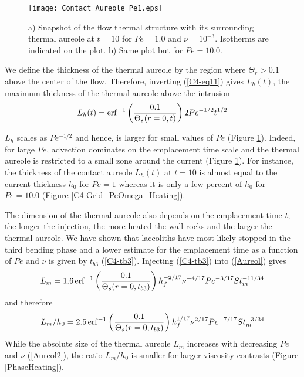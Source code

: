 \begin{figure}[h!]
  \begin{center}
    \graphicspath{ {/Users/thorey/Documents/These/Projet/Refroidissement/Skin_Model/Figure/Figure_Heating/} }
    \texttt{[image: Contact\_Aureole\_Pe1.eps]}
    \caption{a)  Snapshot  of  the  flow thermal  structure  with  its
      surrounding  thermal   aureole  at   $t=10$  for   $Pe=1.0$  and
      $\nu=10^{-3}$.  Isotherms  are indicated  on the plot.   b) Same
      plot but for $Pe=10.0$.}
    \label{Contact_Areuol2}
  \end{center}
\end{figure}

We define  the thickness of  the thermal  aureole by the  region where
$\Theta_r>0.1$  above the  center of  the flow.   Therefore, inverting
(\ref{C4-eq11}) gives  $L_h(t)$, the maximum thickness  of the thermal
aureole above the intrusion
\begin{equation}
  L_h(t)                                                           =
  \operatorname{erf}^{-1}\left(\frac{0.1}{\Theta_s(r=0,t)}\right)2Pe^{-1/2}t^{1/2}
  \label{Aureol}
\end{equation}

$L_h$ scales as  $Pe^{-1/2}$ and hence, is larger for  small values of
$Pe$ (Figure \ref{Contact_Areuol2}). Indeed, for large $Pe$, advection
dominates on  the emplacement  time scale and  the thermal  aureole is
restricted   to   a   small    zone   around   the   current   (Figure
\ref{Contact_Areuol2}).  For  instance, the  thickness of  the contact
aureole $L_h(t)$  at $t=10$ is  almost equal to the  current thickness
$h_0$  for $Pe=1$  whereas  it is  only  a few  percent  of $h_0$  for
$Pe=10.0$ (Figure \ref{C4-Grid_PeOmega_Heating}).

The dimension of  the thermal aureole also depends  on the emplacement
time $t$; the longer the injection, the more heated the wall rocks and
the larger  the thermal  aureole. We have  shown that  laccoliths have
most likely  stopped in the third  bending phase and a  lower estimate
for the emplacement time  as a function of $Pe$ and  $\nu$ is given by
$t_{b3}$ (\ref{C4-tb3}).  Injecting (\ref{C4-tb3}) into (\ref{Aureol})
gives
\begin{equation}
  L_m                                                           =1.6
  \operatorname{erf}^{-1}\left(\frac{0.1}{\Theta_s(r=0,t_{b3})}\right)h_f^{-2/17}\nu^{-4/17}Pe^{-3/17}St_m^{-11/34}
  \label{Aureol2}
\end{equation}
and therefore
\begin{equation}
  L_m/h_0                                                           =2.5
  \operatorname{erf}^{-1}\left(\frac{0.1}{\Theta_s(r=0,t_{b3})}\right)h_f^{1/17}\nu^{2/17}Pe^{-7/17}St_m^{-3/34}
  \label{Aureol3}
\end{equation}
While the  absolute size of  the thermal aureole $L_m$  increases with
decreasing  $Pe$ and  $\nu$  (\ref{Aureol2}), the  ratio $L_m/h_0$  is
smaller for larger viscosity contrasts (Figure \ref{PhaseHeating}).


